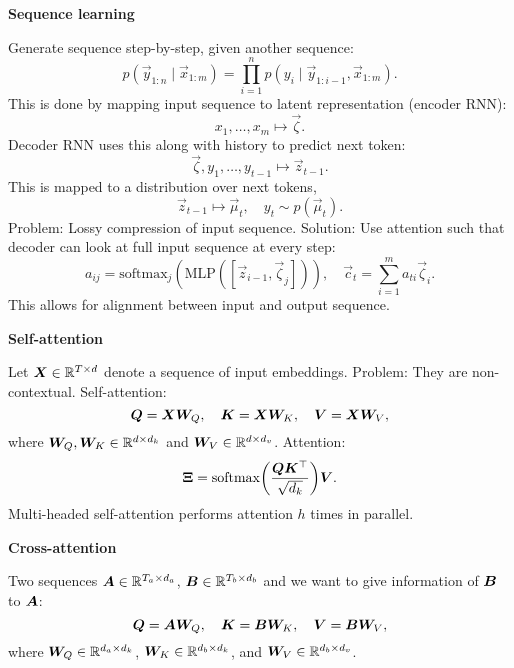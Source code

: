 \documentclass[10pt]{article}
\newenvironment{topic}[1]
{\textbf{\sffamily \colorbox{black}{\rlap{\textbf{\textcolor{white}{#1}}}\hspace{\linewidth}\hspace{-2\fboxsep}}}}
{}
\newenvironment{subtopic}[1]
{\begin{center}\textbf{\sffamily #1}\end{center}}
{}
\begin{document}
\begin{multicols*}{3}
\begin{topic}{Recurrent neural networks}
        \begin{subtopic}{Sequence learning}
            Generate sequence step-by-step, given another sequence: \[
                p(\vec{y}_{1:n} \mid \vec{x}_{1:m}) = \prod_{i=1}^n p(y_i \mid \vec{y}_{1:i-1}, \vec{x}_{1:m}).
            \]
            This is done by mapping input sequence to latent representation (encoder RNN): \[
                x_1, \ldots, x_m \mapsto \vec{\zeta}.
            \]
            Decoder RNN uses this along with history to predict next token: \[
                \vec{\zeta}, y_1, \ldots, y_{t-1} \mapsto \vec{z}_{t-1}.
            \]
            This is mapped to a distribution over next tokens, \[
                \vec{z}_{t-1} \mapsto \vec{\mu}_t, \quad y_t \sim p(\vec{\mu}_t).
            \]
            Problem: Lossy compression of input sequence. Solution: Use attention such that decoder can look at
            full input sequence at every step: \[
                a_{ij} = \mathrm{softmax}_j(\mathrm{MLP}([\vec{z}_{i-1}, \vec{\zeta}_j])), \quad \vec{c}_t = \sum_{i=1}^{m} a_{ti} \vec{\zeta}_i.
            \]
            This allows for alignment between input and output sequence.
        \end{subtopic}

    \end{topic}

    \begin{topic}{Transformers}

        \begin{subtopic}{Self-attention}
            Let $\bm{X} \in \mathbb{R}^{T \times d}$ denote a sequence of input embeddings. Problem: They are non-contextual. Self-attention: \[
                \bm{Q} = \bm{X} \bm{W}_Q, \quad \bm{K} = \bm{X} \bm{W}_K, \quad \bm{V} = \bm{X}\bm{W}_V,
            \]
            where $\bm{W}_Q, \bm{W}_K \in \mathbb{R}^{d\times d_k}$ and $\bm{W}_V \in \mathbb{R}^{d \times d_v}$. Attention: \[
                \mat{\Xi} = \mathrm{softmax} \lft( \frac{\mat{Q} \transpose{\mat{K}}}{\sqrt{d_k}} \rgt) \mat{V}.
            \]
            Multi-headed self-attention performs attention $h$ times in parallel.
        \end{subtopic}

        \begin{subtopic}{Cross-attention}
            Two sequences $\bm{A} \in \mathbb{R}^{T_a \times d_a}$, $\bm{B} \in \mathbb{R}^{T_b \times d_b}$ and we want to give information of $\bm{B}$ to $\bm{A}$: \[
                \bm{Q} = \bm{A}\bm{W}_Q, \quad \bm{K} = \bm{B} \bm{W}_K, \quad \bm{V} = \bm{B}\bm{W}_V,
            \]
            where $\bm{W}_Q \in \mathbb{R}^{d_a \times d_k}$, $\bm{W}_K \in \mathbb{R}^{d_b\times d_k}$, and $\bm{W}_V \in
                \mathbb{R}^{d_b \times d_v}$.


\end{subtopic}
\end{topic}
\end{multicols*}
\end{document}

